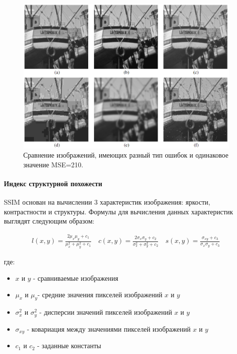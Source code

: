
\begin{figure}[H]
    \centering
    \includegraphics[width=\linewidth]{assets/boat_same_mse.png}
    \caption{ Сравнение изображений, имеющих разный тип ошибок и одинаковое
    значение MSE=210\cite{SSIMArticle}. }
    \label{img:boat_same_mse}
\end{figure}


\paragraph{Индекс структурной похожести}

SSIM основан на вычислении 3 характеристик изображения: яркости, контрастности и
структуры. Формулы для вычисления данных характеристик выглядят следующим
образом:

\begin{gather} \label{eq:ssim_components}
    l\left(x, y\right) = \frac{
        2\mu_{x}\mu_{y} + c_{1}
    }{
        \mu_{x}^{2} + \mu_{y}^{2} + c_{1}
    } \quad
    c\left(x, y\right) = \frac{
        2\sigma_{x}\sigma_{y} + c_{2}
    }{
        \sigma_{x}^{2} + \sigma_{y}^{2} + c_{2}
    } \quad
    s\left(x, y\right) = \frac{
        \sigma_{xy} + c_{3}
    }{
        \sigma_{x} \sigma_{y} + c_{3}
    }
\end{gather}

\noindent где:

\begin{itemize}
    \item $x$ и $y$ - сравниваемые изображения
    \item $\mu_{x}$ и $\mu_{y}$​ - средние значения пикселей изображений $x$ и
    $y$
    \item $\sigma_{x}^{2}$ и $\sigma_{y}^{2}$ - дисперсии значений пикселей
    изображений $x$ и $y$
    \item $\sigma_{xy}$ - ковариация между значениями пикселей изображений $x$ и
    $y$
    \item $c_{1}$ и $c_{2}$ - заданные константы
\end{itemize}

